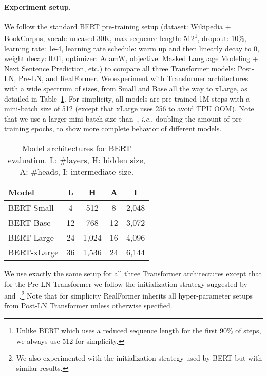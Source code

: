 \documentclass[11pt,a4paper]{article}
\begin{document}
\paragraph{Experiment setup.}
We follow the standard BERT pre-training setup (dataset: Wikipedia + BookCorpus, vocab: uncased 30K, max sequence length: 512\footnote{Unlike BERT which uses a reduced sequence length for the first 90\% of steps, we always use 512 for simplicity.}, dropout: 10\%, learning rate: 1e-4, learning rate schedule: warm up and then linearly decay to 0, weight decay: 0.01, optimizer: AdamW, objective: Masked Language Modeling + Next Sentence Prediction, etc.) to compare all three Transformer models: Post-LN, Pre-LN, and RealFormer. 
We experiment with Transformer architectures with a wide spectrum of sizes, from Small and Base all the way to xLarge, as detailed in Table~\ref{table:bert-arch}. For simplicity, all models are pre-trained 1M steps with a mini-batch size of 512 (except that xLarge uses 256 to avoid TPU OOM). Note that we use a larger mini-batch size than~\citet{Devlin-2019-bert}, \emph{i.e.}, doubling the amount of pre-training epochs, to show more complete behavior of different models.

\begin{table}
\centering
\begin{tabular}{lcccc}
\hline \textbf{Model} & \textbf{L} & \textbf{H} & \textbf{A} & \textbf{I} \\ \hline
BERT-Small  & 4  & 512   & 8  & 2,048 \\
BERT-Base   & 12 & 768   & 12 & 3,072 \\
BERT-Large  & 24 & 1,024 & 16 & 4,096 \\
BERT-xLarge & 36 & 1,536 & 24 & 6,144 \\
\hline
\end{tabular}
\caption{\label{table:bert-arch} Model architectures for BERT evaluation. L: \#layers, H: hidden size, A: \#heads, I: intermediate size.}
\end{table}




We use exactly the same setup for all three Transformer architectures except that for the Pre-LN Transformer we follow the initialization strategy suggested by~\citet{Radford-2019-gpt2} and~\citet{Child-2019-sparsetransformer}.\footnote{We also experimented with the initialization strategy used by BERT but with similar results.} Note that for simplicity RealFormer inherits all hyper-parameter setups from Post-LN Transformer unless otherwise specified.
\end{document}
